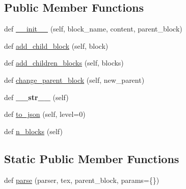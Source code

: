 \subsection*{Public Member Functions}
\begin{DoxyCompactItemize}
\item 
def \hyperlink{classtexla_1_1Parser_1_1Blocks_1_1Block_1_1Block_af80ceabfc4227532e63921f3d8387cfb}{\+\_\+\+\_\+init\+\_\+\+\_\+} (self, block\+\_\+name, content, parent\+\_\+block)
\item 
def \hyperlink{classtexla_1_1Parser_1_1Blocks_1_1Block_1_1Block_aba033196247b84b24bed702573350019}{add\+\_\+child\+\_\+block} (self, block)
\item 
def \hyperlink{classtexla_1_1Parser_1_1Blocks_1_1Block_1_1Block_a1529f89c563d66a4cde7cdbcc8e758de}{add\+\_\+children\+\_\+blocks} (self, blocks)
\item 
def \hyperlink{classtexla_1_1Parser_1_1Blocks_1_1Block_1_1Block_a5007c8a33e96707e02068ec65c30544a}{change\+\_\+parent\+\_\+block} (self, new\+\_\+parent)
\item 
\hypertarget{classtexla_1_1Parser_1_1Blocks_1_1Block_1_1Block_a6015fc7c8783c033f0abc81dedeb6695}{}\label{classtexla_1_1Parser_1_1Blocks_1_1Block_1_1Block_a6015fc7c8783c033f0abc81dedeb6695} 
def {\bfseries \+\_\+\+\_\+str\+\_\+\+\_\+} (self)
\item 
def \hyperlink{classtexla_1_1Parser_1_1Blocks_1_1Block_1_1Block_a80ef96fd4247bdaa6038eea0f5abf2cf}{to\+\_\+json} (self, level=0)
\item 
def \hyperlink{classtexla_1_1Parser_1_1Blocks_1_1Block_1_1Block_a5add9bf131b1916f0220363912d1baec}{n\+\_\+blocks} (self)
\end{DoxyCompactItemize}
\subsection*{Static Public Member Functions}
\begin{DoxyCompactItemize}
\item 
def \hyperlink{classtexla_1_1Parser_1_1Blocks_1_1Block_1_1Block_a2a2862dcf38b90cf8ad1bbd4e7c8f266}{parse} (parser, tex, parent\+\_\+block, params=\{\})
\end{DoxyCompactItemize}
